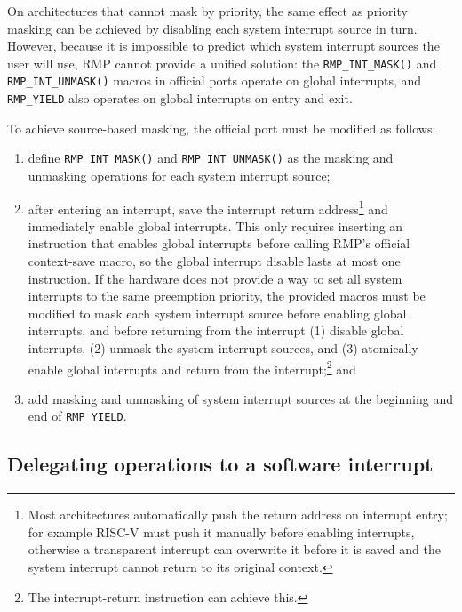 On architectures that cannot mask by priority, the same effect as priority masking can be achieved by disabling each system interrupt source in turn.
However, because it is impossible to predict which system interrupt sources the user will use, RMP cannot provide a unified solution: the \texttt{RMP\_INT\_MASK()} and \texttt{RMP\_INT\_UNMASK()} macros in official ports operate on global interrupts, and \texttt{RMP\_YIELD} also operates on global interrupts on entry and exit.

To achieve source-based masking, the official port must be modified as follows:

\begin{enumerate}
    \item define \texttt{RMP\_INT\_MASK()} and \texttt{RMP\_INT\_UNMASK()} as the masking and unmasking operations for each system interrupt source;
    \item after entering an interrupt, save the interrupt return address\footnote{Most architectures automatically push the return address on interrupt entry; for example RISC-V must push it manually before enabling interrupts, otherwise a transparent interrupt can overwrite it before it is saved and the system interrupt cannot return to its original context.} and immediately enable global interrupts.
    This only requires inserting an instruction that enables global interrupts before calling RMP's official context-save macro, so the global interrupt disable lasts at most one instruction.
    If the hardware does not provide a way to set all system interrupts to the same preemption priority, the provided macros must be modified to mask each system interrupt source before enabling global interrupts, and before returning from the interrupt (1) disable global interrupts, (2) unmask the system interrupt sources, and (3) atomically enable global interrupts and return from the interrupt;\footnote{The interrupt-return instruction can achieve this.}
    and
    \item add masking and unmasking of system interrupt sources at the beginning
    and end of \texttt{RMP\_YIELD}.
\end{enumerate}

\subsection{Delegating operations to a software interrupt}

